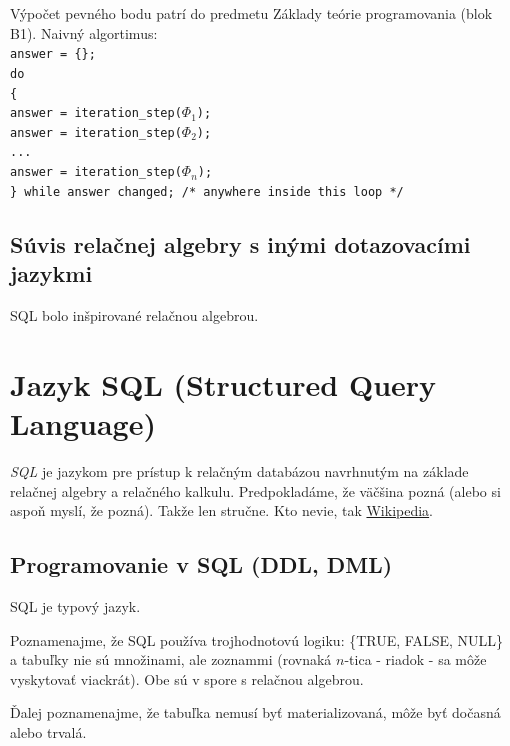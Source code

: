\documentclass[10pt,a4paper]{article}
\begin{document}
Výpočet pevného bodu patrí do predmetu Základy teórie programovania (blok B1). 
Naivný algortimus: \\
\verb|answer = {};| \\
\verb|do| \\
\verb|{| \\
\verb|answer = iteration_step(|$\Phi_1$\verb|);| \\
\verb|answer = iteration_step(|$\Phi_2$\verb|);| \\
\verb|...| \\
\verb|answer = iteration_step(|$\Phi_n$\verb|);| \\
\verb|} while answer changed; /* anywhere inside this loop */| \\



\subsection{Súvis relačnej algebry s inými dotazovacími jazykmi}
\label{relacna_algebra_suvis}

SQL bolo inšpirované relačnou algebrou. 
    
\section{Jazyk SQL (Structured Query Language)} 
\emph{SQL} je jazykom pre prístup k relačným databázou navrhnutým na základe relačnej algebry a relačného kalkulu. 
Predpokladáme, že väčšina pozná (alebo si aspoň myslí, že pozná). Takže len stručne. 
Kto nevie, tak \href{http://en.wikipedia.org/wiki/SQL}{Wikipedia}. 

\subsection{Programovanie v SQL (DDL, DML)}

SQL je typový jazyk.

Poznamenajme, že SQL používa trojhodnotovú logiku: \{TRUE, FALSE, NULL\}
a tabuľky nie sú množinami, ale zoznammi (rovnaká $n$-tica - riadok - sa môže vyskytovať viackrát). Obe sú v spore s relačnou algebrou. 

Ďalej poznamenajme, že tabuľka nemusí byť materializovaná, môže byť dočasná alebo trvalá. 
\end{document}
